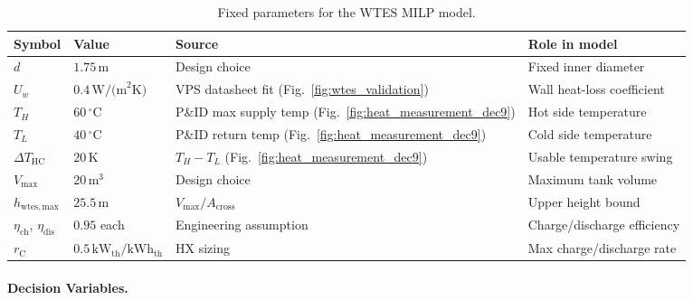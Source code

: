 \documentclass[11pt,a4paper]{report}
\begin{document}
\begin{table}[H]
\centering
\caption{Fixed parameters for the WTES MILP model.}
\label{tab:wtes_inputs}
\begin{tabular}{lllp{4.5cm}}
\hline
\textbf{Symbol} & \textbf{Value} & \textbf{Source} & \textbf{Role in model} \\
\hline
$d$ & $1.75\,\text{m}$ & Design choice & Fixed inner diameter \\
$U_w$ & $0.4\,\text{W/(m}^2\text{K)}$ & VPS datasheet fit (Fig.~\ref{fig:wtes_validation}) & Wall heat-loss coefficient \\
$T_H$ & $60\,^{\circ}\text{C}$ & P\&ID max supply temp (Fig.~\ref{fig:heat_measurement_dec9}) & Hot side temperature \\
$T_L$ & $40\,^{\circ}\text{C}$ & P\&ID return temp (Fig.~\ref{fig:heat_measurement_dec9}) & Cold side temperature \\
$\Delta T_\mathrm{HC}$ & $20\,\text{K}$ & $T_H - T_L$ (Fig.~\ref{fig:heat_measurement_dec9}) & Usable temperature swing \\
$V_\mathrm{max}$ & $20\,\text{m}^3$ & Design choice & Maximum tank volume \\
$h_\mathrm{wtes,max}$ & $25.5\,\text{m}$ & $V_\mathrm{max}/A_\mathrm{cross}$ & Upper height bound \\
$\eta_\mathrm{ch}$, $\eta_\mathrm{dis}$ & $0.95$ each & Engineering assumption & Charge/discharge efficiency \\
$r_\mathrm{C}$ & $0.5\,\text{kW}_\mathrm{th}/\text{kWh}_\mathrm{th}$ & HX sizing & Max charge/discharge rate \\
\hline
\end{tabular}
\end{table}

\paragraph{Decision Variables.}
\end{document}
